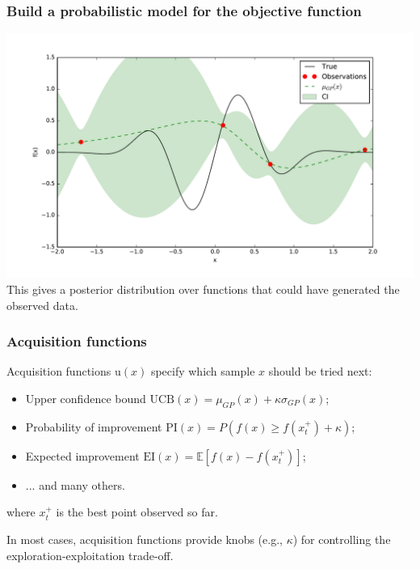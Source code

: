 \documentclass{beamer}
\begin{document}
\begin{frame}
    \frametitle{Build a probabilistic model for the objective function}
    \begin{center}
        \includegraphics[width=\textwidth]{code/fig2.pdf} \\
        This gives a posterior distribution over functions that could have generated the observed data.
    \end{center}
\end{frame}

\begin{frame}
    \frametitle{Acquisition functions}

    Acquisition functions $\text{u}(x)$ specify which sample $x$ should be tried next:

    \begin{itemize}
        \item Upper confidence bound
            $\text{UCB}(x) = \mu_{GP}(x) + \kappa \sigma_{GP}(x)$;
        \item Probability of improvement
            $\text{PI}(x) = P(f(x) \geq f(x_t^+) + \kappa) $;
        \item Expected improvement
            $\text{EI}(x) = \mathbb{E} [f(x) - f(x_t^+)] $;
        \item ... and many others.
    \end{itemize}

    where $x_t^+$ is the best point observed so far.

    \vspace{1em}

    In most cases, acquisition functions provide knobs (e.g., $\kappa$) for
    controlling the exploration-exploitation trade-off.

\end{frame}
\end{document}
